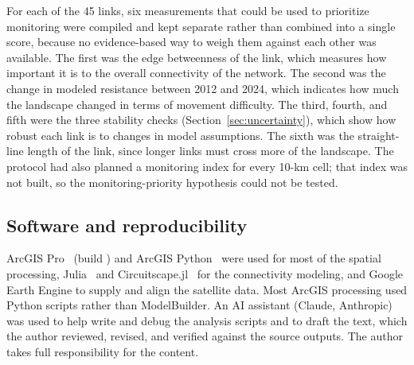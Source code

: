 For each of the 45 links, six measurements that could be used to prioritize monitoring were compiled and kept separate rather than combined into a single score, because no evidence-based way to weigh them against each other was available. The first was the edge betweenness of the link, which measures how important it is to the overall connectivity of the network. The second was the change in modeled resistance between 2012 and 2024, which indicates how much the landscape changed in terms of movement difficulty. The third, fourth, and fifth were the three stability checks (Section~\ref{sec:uncertainty}), which show how robust each link is to changes in model assumptions. The sixth was the straight-line length of the link, since longer links must cross more of the landscape. The protocol had also planned a monitoring index for every 10-km cell; that index was not built, so the monitoring-priority hypothesis could not be tested.

\subsection{Software and reproducibility}
\label{sec:software}

ArcGIS Pro \arcgisversion\ (build \arcgisbuild) and ArcGIS Python \pythonversion\ were used for most of the spatial processing, Julia \juliaversion\ and Circuitscape.jl \circuitscapeversion\ for the connectivity modeling, and Google Earth Engine to supply and align the satellite data. Most ArcGIS processing used Python scripts rather than ModelBuilder. An AI assistant (Claude, Anthropic) was used to help write and debug the analysis scripts and to draft the text, which the author reviewed, revised, and verified against the source outputs. The author takes full responsibility for the content.
